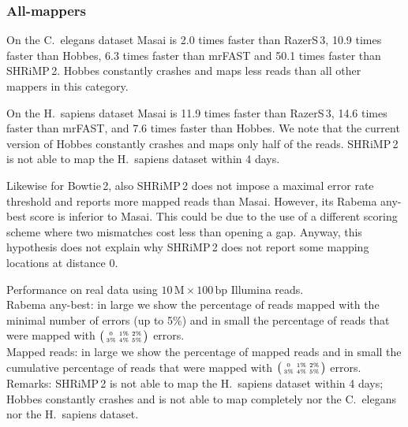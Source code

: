 \subsubsection{All-mappers}
On the C.~elegans dataset Masai is 2.0 times faster than RazerS\,3, 10.9 times faster than Hobbes, 6.3 times faster than mrFAST and 50.1 times faster than SHRiMP\,2.
Hobbes constantly crashes and maps less reads than all other mappers in this category.

On the H.~sapiens dataset Masai is 11.9 times faster than RazerS\,3, 14.6 times faster than mrFAST, and 7.6 times faster than Hobbes.
We note that the current version of Hobbes constantly crashes and maps only half of the reads.
SHRiMP\,2 is not able to map the H.~sapiens dataset within 4 days.

Likewise for Bowtie\,2, also SHRiMP\,2 does not impose a maximal error rate threshold and reports more mapped reads than Masai.
However, its Rabema any-best score is inferior to Masai.
This could be due to the use of a different scoring scheme where two mismatches cost less than opening a gap.
Anyway, this hypothesis does not explain why SHRiMP\,2 does not report some mapping locations at distance 0.

\begin{table*}[t]
  \caption[Masai performance on real data]{
    \label{tab:Runtime}
    Performance on real data using $10\,\text{M}\times 100\,\text{bp}$ Illumina reads.\\
	Rabema any-best: in large we show the percentage of reads mapped with the minimal number of errors (up to 5\%) and in small the percentage of reads that were mapped with $\bigl(\begin{smallmatrix}\mbox{\tiny 0}&\mbox{\tiny 1\%}&\mbox{\tiny 2\%}\\\mbox{\tiny 3\%}&\mbox{\tiny 4\%}&\mbox{\tiny 5\%}\end{smallmatrix}\bigr)$ errors.\\
	Mapped reads: in large we show the percentage of mapped reads and in small the cumulative percentage of reads that were mapped with $\bigl(\begin{smallmatrix}\mbox{\tiny 0}&\mbox{\tiny 1\%}&\mbox{\tiny 2\%}\\\mbox{\tiny 3\%}&\mbox{\tiny 4\%}&\mbox{\tiny 5\%}\end{smallmatrix}\bigr)$ errors.\\
	Remarks:
    SHRiMP\,2 is not able to map the H.~sapiens dataset within 4 days;
    Hobbes constantly crashes and is not able to map completely nor the C.~elegans nor the H.~sapiens dataset.
  }
	\vspace{-3mm}
	\center
	\sffamily
	\resizebox{1.0\textwidth}{!}
	{
		\renewcommand{\tabcolsep}{0.8ex}
		
	}
\end{table*}


